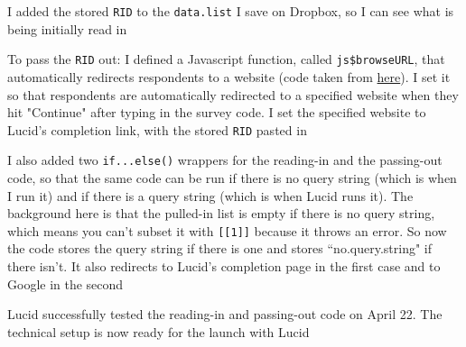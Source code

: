 \begin{coi}
\begin{coi}
\begin{coi}
						\item I added the stored \texttt{RID} to the \texttt{data.list} I save on Dropbox, so I can see what is being initially read in
						\item To pass the \texttt{RID} out: I defined a Javascript function, called \texttt{js\$browseURL}, that automatically redirects respondents to a website (code taken from \href{https://stackoverflow.com/questions/41426016/shiny-open-multiple-browser-tabs?rq=1}{here}). I set it so that respondents are automatically redirected to a specified website when they hit "Continue" after typing in the survey code. I set the specified website to Lucid's completion link, with the stored \texttt{RID} pasted in
						\item I also added two \texttt{if...else()} wrappers for the reading-in and the passing-out code, so that the same code can be run if there is no query string (which is when I run it) and if there is a query string (which is when Lucid runs it). The background here is that the pulled-in list is empty if there is no query string, which means you can't subset it with \texttt{[[1]]} because it throws an error. So now the code stores the query string if there is one and stores ``no.query.string" if there isn't. It also redirects to Lucid's completion page in the first case and to Google in the second
					\end{coi}
				\item Lucid successfully tested the reading-in and passing-out code on April 22. The technical setup is now ready for the launch with Lucid
			\end{coi}
	\end{coi}
	

